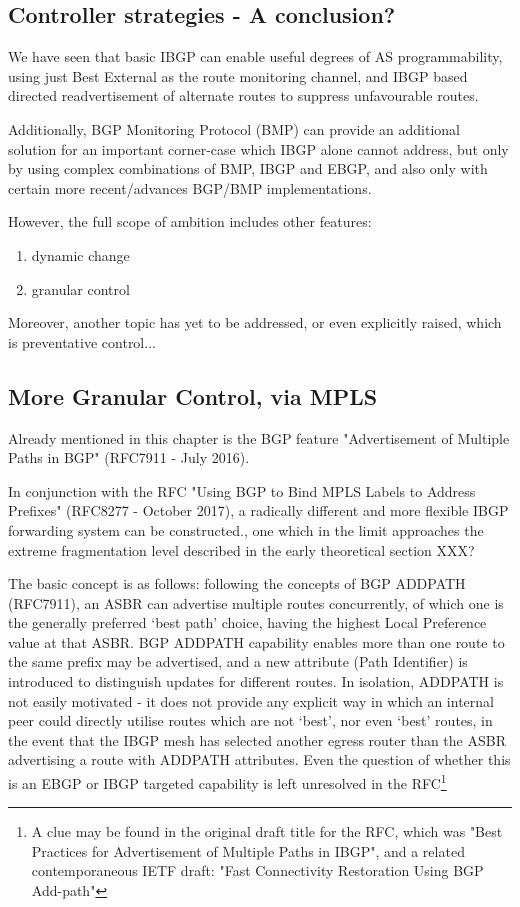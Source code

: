 \subsection{Controller strategies - A conclusion?}
We have seen that basic IBGP can enable useful degrees of AS programmability,
using just Best External as the route monitoring channel, and IBGP based
directed readvertisement of alternate routes to suppress unfavourable routes.

Additionally, BGP Monitoring Protocol (BMP) can provide an additional solution
for an important corner-case which IBGP alone cannot address, but only by using
complex combinations of BMP, IBGP and EBGP, and also only with certain more
recent/advances BGP/BMP implementations.

However, the full scope of ambition includes other features:

\begin{enumerate}
	\item  dynamic change
	\item  granular control
\end{enumerate}

Moreover, another topic has yet to be addressed, or even explicitly raised, which is preventative control...

\subsection{More Granular Control, via MPLS}

Already mentioned in this chapter is the BGP feature "Advertisement of Multiple Paths in BGP" (RFC7911\cite{rfc7911} -  July 2016).

In conjunction with the RFC "Using BGP to Bind MPLS Labels to Address Prefixes" (RFC8277\cite{rfc8277} - October 2017), a radically different and more flexible IBGP forwarding system can be constructed., one which in the limit approaches the extreme fragmentation level described in the early theoretical section XXX?

The basic concept is as follows: following the concepts of BGP ADDPATH (RFC7911), an ASBR can advertise multiple routes concurrently, of which one is the generally preferred `best path' choice, having the highest Local Preference value at that ASBR. BGP ADDPATH capability enables more than one route to the same prefix may be advertised, and a new attribute (Path Identifier) is introduced to distinguish updates for different routes.
In isolation, ADDPATH is not easily motivated - it does not provide any explicit way in which an internal peer could directly utilise routes which are not `best', nor even `best' routes, in the event that the IBGP mesh has selected another egress router than the ASBR advertising a route with ADDPATH attributes.  Even the question of whether this is an EBGP or IBGP targeted capability is left unresolved in the RFC\footnote{A clue may be found in the original draft title for the RFC, which was "Best Practices for Advertisement of Multiple Paths in IBGP", and a related contemporaneous IETF draft: "Fast Connectivity Restoration Using BGP Add-path"}

